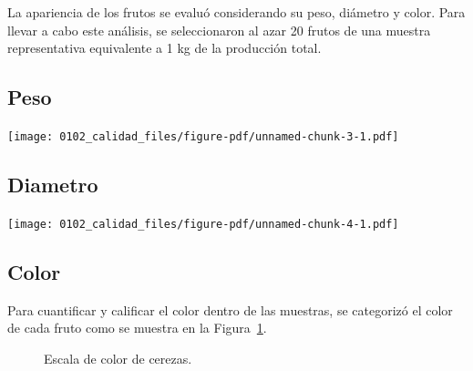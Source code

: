 \documentclass[
  letterpaper,
  DIV=11,
  numbers=noendperiod]{scrreprt}
\begin{document}
La apariencia de los frutos se evaluó considerando su peso, diámetro y
color. Para llevar a cabo este análisis, se seleccionaron al azar 20
frutos de una muestra representativa equivalente a 1 kg de la producción
total.

\subsection{Peso}\label{peso}

\begin{center}
\texttt{[image: 0102\_calidad\_files/figure-pdf/unnamed-chunk-3-1.pdf]}
\end{center}

\subsection{Diametro}\label{diametro}

\begin{center}
\texttt{[image: 0102\_calidad\_files/figure-pdf/unnamed-chunk-4-1.pdf]}
\end{center}

\subsection{Color}\label{color}

Para cuantificar y calificar el color dentro de las muestras, se
categorizó el color de cada fruto como se muestra en la
Figura~\ref{fig-escala}.

\begin{figure}


\caption{\label{fig-escala}Escala de color de cerezas.}

\end{figure}%
\end{document}
